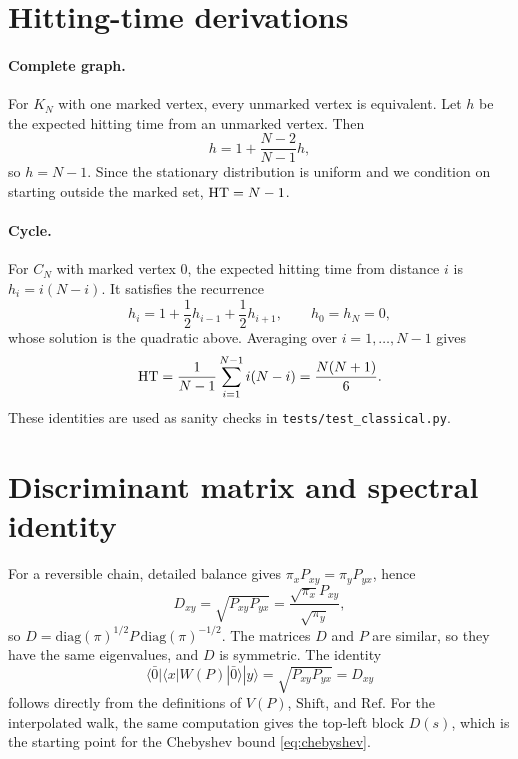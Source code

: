 \section{Hitting-time derivations}
\label{app:hitting}

\paragraph{Complete graph.}
For $K_N$ with one marked vertex, every unmarked vertex is equivalent. Let $h$
be the expected hitting time from an unmarked vertex. Then
\begin{equation}
  h=1+\frac{N-2}{N-1}h,
\end{equation}
so $h=N-1$. Since the stationary distribution is uniform and we condition on
starting outside the marked set, $\mathrm{HT}=N-1$.

\paragraph{Cycle.}
For $C_N$ with marked vertex $0$, the expected hitting time from distance $i$ is
$h_i=i(N-i)$. It satisfies the recurrence
\begin{equation}
  h_i=1+\frac{1}{2}h_{i-1}+\frac{1}{2}h_{i+1},\qquad h_0=h_N=0,
\end{equation}
whose solution is the quadratic above. Averaging over
$i=1,\dots,N-1$ gives
\begin{equation}
  \mathrm{HT}=\frac{1}{N-1}\sum_{i=1}^{N-1}i(N-i)=\frac{N(N+1)}{6}.
\end{equation}
These identities are used as sanity checks in \texttt{tests/test\_classical.py}.

\section{Discriminant matrix and spectral identity}
\label{app:discriminant}

For a reversible chain, detailed balance gives
$\pi_xP_{xy}=\pi_yP_{yx}$, hence
\begin{equation}
  D_{xy}=\sqrt{P_{xy}P_{yx}}
  =\frac{\sqrt{\pi_x}P_{xy}}{\sqrt{\pi_y}},
\end{equation}
so $D=\mathrm{diag}(\pi)^{1/2}P\,\mathrm{diag}(\pi)^{-1/2}$. The matrices $D$
and $P$ are similar, so they have the same eigenvalues, and $D$ is symmetric.
The identity
\begin{equation}
  \langle\bar0|\langle x|W(P)|\bar0\rangle|y\rangle
  =\sqrt{P_{xy}P_{yx}}=D_{xy}
\end{equation}
follows directly from the definitions of $V(P)$, $\mathrm{Shift}$, and
$\mathrm{Ref}$. For the interpolated walk, the same computation gives the
top-left block $D(s)$, which is the starting point for the Chebyshev bound
\eqref{eq:chebyshev}.

